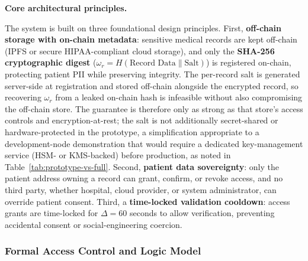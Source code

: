 \documentclass[journal,onecolumn]{IEEEtran}
\begin{document}
\noindent\textbf{Core architectural principles.}

The system is built on three foundational design principles. First, \textbf{off-chain storage with on-chain metadata}: sensitive medical records are kept off-chain (IPFS or secure HIPAA-compliant cloud storage), and only the \textbf{SHA-256 cryptographic digest} ($\omega_r = H(\text{Record Data} \parallel \text{Salt})$) is registered on-chain, protecting patient PII while preserving integrity. The per-record salt is generated server-side at registration and stored off-chain alongside the encrypted record, so recovering $\omega_r$ from a leaked on-chain hash is infeasible without also compromising the off-chain store. The guarantee is therefore only as strong as that store's access controls and encryption-at-rest; the salt is not additionally secret-shared or hardware-protected in the prototype, a simplification appropriate to a development-node demonstration that would require a dedicated key-management service (HSM- or KMS-backed) before production, as noted in Table~\ref{tab:prototype-vs-full}. Second, \textbf{patient data sovereignty}: only the patient address owning a record can grant, confirm, or revoke access, and no third party, whether hospital, cloud provider, or system administrator, can override patient consent. Third, a \textbf{time-locked validation cooldown}: access grants are time-locked for $\Delta = 60$ seconds to allow verification, preventing accidental consent or social-engineering coercion.

\subsubsection{Formal Access Control and Logic Model}
\end{document}
